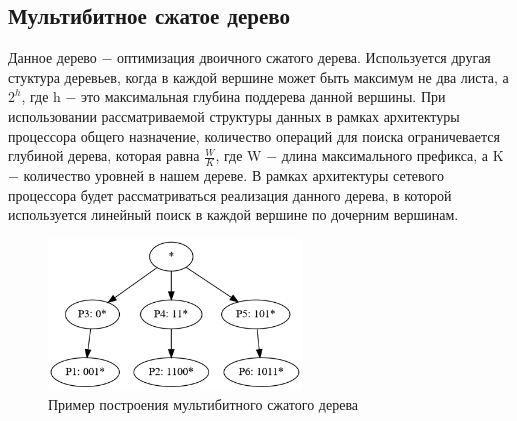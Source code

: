 \documentclass[a4peper, 12pt, titlepage, finall]{report}
\begin{document}
        \subsection{Мультибитное сжатое дерево}
            Данное дерево $-$ оптимизация двоичного сжатого дерева. Используется другая стуктура деревьев, когда в каждой вершине
            может быть максимум не два листа, а {\ttfamily $2^h$}, где {\ttfamily h} $-$ это максимальная глубина поддерева данной вершины.
            При использовании рассматриваемой структуры данных в рамках архитектуры процессора общего назначение, количество операций для поиска ограничевается глубиной дерева,
            которая равна {\ttfamily $\frac{W}{K}$}, где {\ttfamily W} $-$ длина максимального префикса, а {\ttfamily K} $-$ количество уровней в нашем дереве.
            В рамках архитектуры сетевого процессора будет рассматриваться реализация данного дерева, в которой используется линейный поиск в каждой вершине по дочерним вершинам.

            \begin{figure}[h]
                \centering
                \includegraphics[width=0.6\textwidth]{multybit_compressed.png}
                \caption{Пример построения мультибитного сжатого дерева}\label{fig:mesh3}
            \end{figure}
\end{document}
